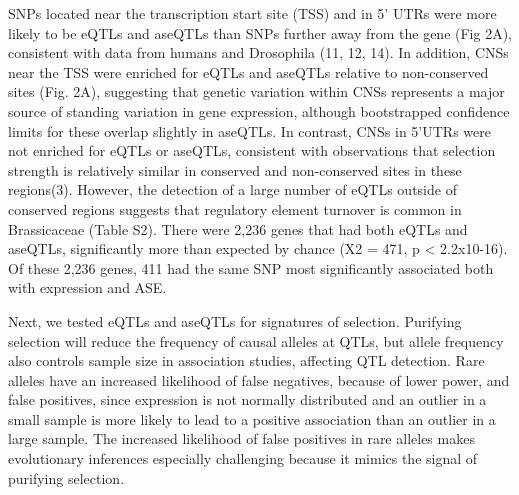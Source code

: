 SNPs located near the transcription start site (TSS) and in 5’ UTRs were more likely to be eQTLs and aseQTLs than SNPs further away from the gene (Fig 2A), consistent with data from humans and Drosophila (11, 12, 14). In addition, CNSs near the TSS were enriched for eQTLs and aseQTLs relative to non-conserved sites (Fig. 2A), suggesting that genetic variation within CNSs represents a major source of standing variation in gene expression, although bootstrapped confidence limits for these overlap slightly in aseQTLs. In contrast, CNSs in 5’UTRs were not enriched for eQTLs or aseQTLs, consistent with observations that selection strength is relatively similar in conserved and non-conserved sites in these regions(3). However, the detection of a large number of eQTLs outside of conserved regions suggests that regulatory element turnover is common in Brassicaceae (Table S2). There were 2,236 genes that had both eQTLs and aseQTLs, significantly more than expected by chance (X2 = 471, p < 2.2x10-16). Of these 2,236 genes, 411 had the same SNP most significantly associated both with expression and ASE.

Next, we tested eQTLs and aseQTLs for signatures of selection. Purifying selection will reduce the frequency of causal alleles at QTLs, but allele frequency also controls sample size in association studies, affecting QTL detection. Rare alleles have an increased likelihood of false negatives, because of lower power, and false positives, since expression is not normally distributed and an outlier in a small sample is more likely to lead to a positive association than an outlier in a large sample. The increased likelihood of false positives in rare alleles makes evolutionary inferences especially challenging because it mimics the signal of purifying selection.

